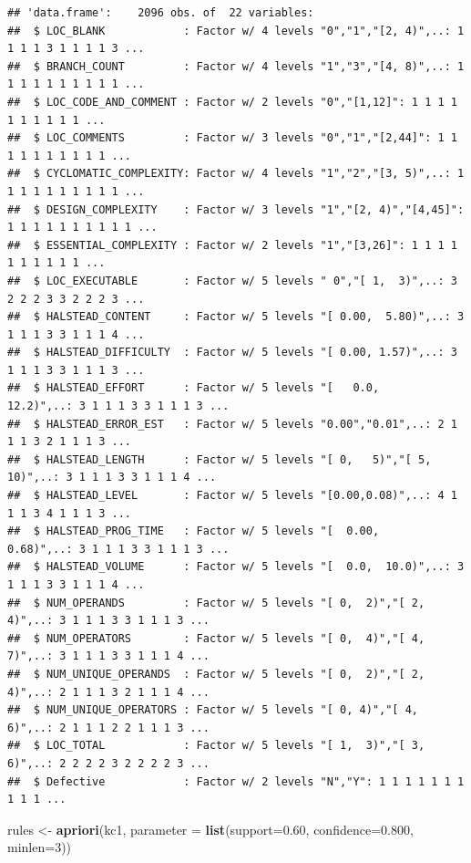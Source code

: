 \documentclass[]{book}
\newenvironment{Shaded}{\begin{snugshade}}{\end{snugshade}}
\newcommand{\KeywordTok}[1]{\textcolor[rgb]{0.13,0.29,0.53}{\textbf{{#1}}}}
\newcommand{\DataTypeTok}[1]{\textcolor[rgb]{0.13,0.29,0.53}{{#1}}}
\newcommand{\DecValTok}[1]{\textcolor[rgb]{0.00,0.00,0.81}{{#1}}}
\newcommand{\FloatTok}[1]{\textcolor[rgb]{0.00,0.00,0.81}{{#1}}}
\newcommand{\StringTok}[1]{\textcolor[rgb]{0.31,0.60,0.02}{{#1}}}
\newcommand{\NormalTok}[1]{{#1}}
\begin{document}
\begin{verbatim}
## 'data.frame':    2096 obs. of  22 variables:
##  $ LOC_BLANK            : Factor w/ 4 levels "0","1","[2, 4)",..: 1 1 1 1 3 1 1 1 1 3 ...
##  $ BRANCH_COUNT         : Factor w/ 4 levels "1","3","[4, 8)",..: 1 1 1 1 1 1 1 1 1 1 ...
##  $ LOC_CODE_AND_COMMENT : Factor w/ 2 levels "0","[1,12]": 1 1 1 1 1 1 1 1 1 1 ...
##  $ LOC_COMMENTS         : Factor w/ 3 levels "0","1","[2,44]": 1 1 1 1 1 1 1 1 1 1 ...
##  $ CYCLOMATIC_COMPLEXITY: Factor w/ 4 levels "1","2","[3, 5)",..: 1 1 1 1 1 1 1 1 1 1 ...
##  $ DESIGN_COMPLEXITY    : Factor w/ 3 levels "1","[2, 4)","[4,45]": 1 1 1 1 1 1 1 1 1 1 ...
##  $ ESSENTIAL_COMPLEXITY : Factor w/ 2 levels "1","[3,26]": 1 1 1 1 1 1 1 1 1 1 ...
##  $ LOC_EXECUTABLE       : Factor w/ 5 levels " 0","[ 1,  3)",..: 3 2 2 2 3 3 2 2 2 3 ...
##  $ HALSTEAD_CONTENT     : Factor w/ 5 levels "[ 0.00,  5.80)",..: 3 1 1 1 3 3 1 1 1 4 ...
##  $ HALSTEAD_DIFFICULTY  : Factor w/ 5 levels "[ 0.00, 1.57)",..: 3 1 1 1 3 3 1 1 1 3 ...
##  $ HALSTEAD_EFFORT      : Factor w/ 5 levels "[   0.0,    12.2)",..: 3 1 1 1 3 3 1 1 1 3 ...
##  $ HALSTEAD_ERROR_EST   : Factor w/ 5 levels "0.00","0.01",..: 2 1 1 1 3 2 1 1 1 3 ...
##  $ HALSTEAD_LENGTH      : Factor w/ 5 levels "[ 0,   5)","[ 5,  10)",..: 3 1 1 1 3 3 1 1 1 4 ...
##  $ HALSTEAD_LEVEL       : Factor w/ 5 levels "[0.00,0.08)",..: 4 1 1 1 3 4 1 1 1 3 ...
##  $ HALSTEAD_PROG_TIME   : Factor w/ 5 levels "[  0.00,    0.68)",..: 3 1 1 1 3 3 1 1 1 3 ...
##  $ HALSTEAD_VOLUME      : Factor w/ 5 levels "[  0.0,  10.0)",..: 3 1 1 1 3 3 1 1 1 4 ...
##  $ NUM_OPERANDS         : Factor w/ 5 levels "[ 0,  2)","[ 2,  4)",..: 3 1 1 1 3 3 1 1 1 3 ...
##  $ NUM_OPERATORS        : Factor w/ 5 levels "[ 0,  4)","[ 4,  7)",..: 3 1 1 1 3 3 1 1 1 4 ...
##  $ NUM_UNIQUE_OPERANDS  : Factor w/ 5 levels "[ 0,  2)","[ 2,  4)",..: 2 1 1 1 3 2 1 1 1 4 ...
##  $ NUM_UNIQUE_OPERATORS : Factor w/ 5 levels "[ 0, 4)","[ 4, 6)",..: 2 1 1 1 2 2 1 1 1 3 ...
##  $ LOC_TOTAL            : Factor w/ 5 levels "[ 1,  3)","[ 3,  6)",..: 2 2 2 2 3 2 2 2 2 3 ...
##  $ Defective            : Factor w/ 2 levels "N","Y": 1 1 1 1 1 1 1 1 1 1 ...
\end{verbatim}

\begin{Shaded}
\begin{Highlighting}[]
\NormalTok{rules <-}\StringTok{ }\KeywordTok{apriori}\NormalTok{(kc1, }\DataTypeTok{parameter =} \KeywordTok{list}\NormalTok{(}\DataTypeTok{support=}\FloatTok{0.60}\NormalTok{, }\DataTypeTok{confidence=}\FloatTok{0.800}\NormalTok{, }\DataTypeTok{minlen=}\DecValTok{3}\NormalTok{))}
\end{Highlighting}
\end{Shaded}
\end{document}
